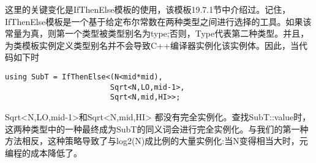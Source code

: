 这里的关键变化是IfThenElse模板的使用，该模板19.7.1节中介绍过。记住，IfThenElse模板是一个基于给定布尔常数在两种类型之间进行选择的工具。如果该常量为真，则第一个类型被类型别名为type;否则，Type代表第二种类型。并且，为类模板实例定义类型别名并不会导致C++编译器实例化该实例体。因此，当代码如下时

\begin{lstlisting}[style=styleCXX]
using SubT = IfThenElse<(N<mid*mid),
						Sqrt<N,LO,mid-1>,
						Sqrt<N,mid,HI>>;
\end{lstlisting}

Sqrt<N,LO,mid-1>和Sqrt<N,mid,HI> 都没有完全实例化。查找SubT::value时，这两种类型中的一种最终成为SubT的同义词会进行完全实例化。与我们的第一种方法相反，这种策略导致了与log2(N)成比例的大量实例化:当N变得相当大时，元编程的成本降低了。
















